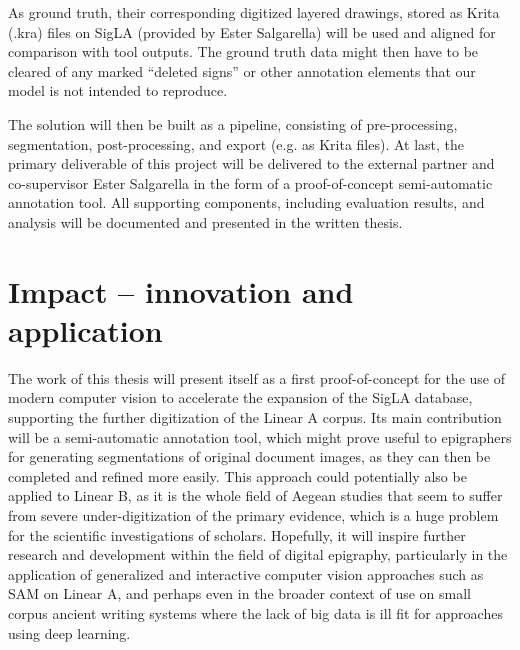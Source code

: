 As ground truth, their corresponding digitized layered drawings, stored as Krita (.kra) files on SigLA (provided by Ester Salgarella) will be used and aligned for comparison with tool outputs.
The ground truth data might then have to be cleared of any marked 
“deleted signs” or other annotation elements that our model is not intended to reproduce.

The solution will then be built as a pipeline, consisting of
pre-processing, segmentation, post-processing, and export (e.g. as Krita files).
At last, the primary deliverable of this project will be delivered to the external partner and co-supervisor Ester Salgarella in the form of a proof-of-concept semi-automatic annotation tool.
All supporting components, 
including evaluation results, and analysis will be documented and presented in the written 
thesis. 

\section{Impact -- innovation and application}

The work of this thesis will present itself as a first proof-of-concept for the use of modern computer vision to accelerate the expansion of the SigLA database, supporting the further digitization of the Linear A corpus.
Its main contribution will be a semi-automatic annotation tool, which might prove useful to epigraphers for generating segmentations of original document images, as they can then be completed and refined more easily.
This approach could potentially also be applied to Linear B, as it is the whole field of Aegean studies that seem to suffer from severe under-digitization of the primary evidence, which is a huge problem for the scientific investigations of scholars.
Hopefully, it will inspire further research and development within the field of digital epigraphy, particularly in the application of generalized and interactive computer vision approaches such as \acs{SAM} on Linear A, and perhaps even in the broader context of use on small corpus ancient writing systems where the lack of big data is ill fit for approaches using deep learning.
